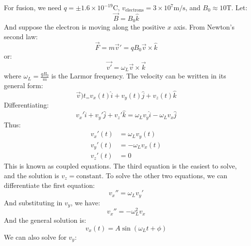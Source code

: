\begin{itemize}
\begin{example}
        For fusion, we need $q = \pm 1.6 \times 10^{-19} \si{\coulomb}$, $v_\text{electrons} = 3 \times 10^{7} \si{\meter\per\second}$, and $B_0 \approx 10\si{\tesla}$. Let:
        \begin{equation}
            \vec{B} = B_0 \hat{k}
        \end{equation}
        And suppose the electron is moving along the positive $x$ axis. From Newton's second law:
        \begin{equation}
            \vec{F} = m \vec{v}' = qB_0 \vec{v} \times \hat{k}
        \end{equation}
        or:
        \begin{equation}
            \vec{v'} = \omega_L  \vec{v} \times \vec{k}
        \end{equation}
        where $\omega_L  = \frac{qB_0}{m}$ is the Larmor frequency. The velocity can be written in its general form:
        \begin{equation}
            \vec{v})t_ = v_x(t)\hat{i} + v_y(t)\hat{j}+v_z(t)\hat{k}
        \end{equation}
        Differentiating:
        \begin{equation}
            v_x' \hat{i} + v_y'\hat{j} + v_z'\hat{k} = \omega_L  v_y \hat{i} - \omega_L  v_x \hat{j}
        \end{equation}
        Thus:
        \begin{align}
            v_x'(t) &= \omega_L  v_y(t) \\
            v_y'(t) &= -\omega_L  v_x(t) \\ 
            v_z'(t) &= 0
        \end{align}
        This is known as coupled equations. The third equation is the easiest to solve, and the solution is $v_z=\text{constant}$. To solve the other two equations, we can differentiate the first equation:
        \begin{equation}
            v_x'' = \omega_L  v_y'
        \end{equation}
        And substituting in $v_y$, we have:
        \begin{equation}
            v_x'' = -\omega_L ^2 v_x
        \end{equation}
        And the general solution is:
        \begin{equation}
            v_x(t) = A\sin(\omega_L  t + \phi)
        \end{equation}
        We can also solve for $v_y$:
        \begin{equation}

\end{equation}
\end{example}
\end{itemize}
